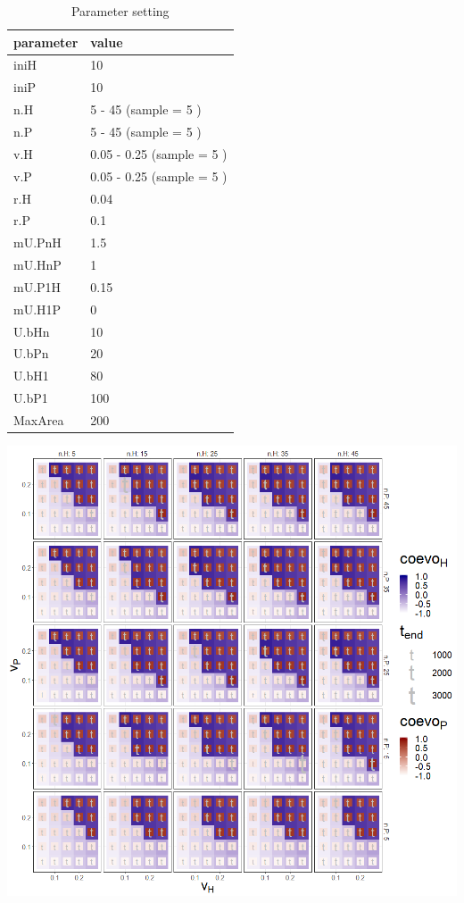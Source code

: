 \documentclass[]{book}
\begin{document}
\begin{table}[!h]

\caption{\label{tab:4nvtablepdf}Parameter setting}
\centering
\begin{tabular}{l|l}
\hline
parameter & value\\
\hline
iniH & 10\\
\hline
iniP & 10\\
\hline
n.H & 5 - 45 (sample = 5 )\\
\hline
n.P & 5 - 45 (sample = 5 )\\
\hline
v.H & 0.05 - 0.25 (sample = 5 )\\
\hline
v.P & 0.05 - 0.25 (sample = 5 )\\
\hline
r.H & 0.04\\
\hline
r.P & 0.1\\
\hline
mU.PnH & 1.5\\
\hline
mU.HnP & 1\\
\hline
mU.P1H & 0.15\\
\hline
mU.H1P & 0\\
\hline
U.bHn & 10\\
\hline
U.bPn & 20\\
\hline
U.bH1 & 80\\
\hline
U.bP1 & 100\\
\hline
MaxArea & 200\\
\hline
\end{tabular}
\end{table}

\newpage

\includegraphics[width=1\linewidth]{plots/4_fourPar-n-v_plot}
\end{document}
